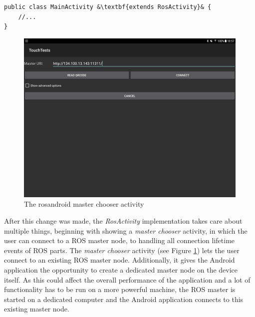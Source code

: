\begin{lstlisting}[caption={Changes to MainActivity}, escapechar=&]
public class MainActivity &\textbf{extends RosActivity}& {
	//...
}
\end{lstlisting}

\begin{figure}
\caption{\label{fig:impl:masterchooser}The rosandroid master chooser activity}
\includegraphics[width=\linewidth]{assets/chpt_impl/masterchooser}	
\end{figure}

After this change was made, the \textit{RosActivity} implementation takes care about multiple things, beginning with showing a \textit{master chooser}  activity, in which the user can connect to a ROS master node, to handling all connection lifetime events of ROS parts. The \textit{master chooser} activity (see Figure \ref{fig:impl:masterchooser}) lets the user connect to an existing ROS master node. Additionally, it gives the Android application the opportunity to create a dedicated master node on the device itself. As this could affect the overall performance of the application and a lot of functionality has to be run on a more powerful machine, the ROS master is started on a dedicated computer and the Android application connects to this existing master node.

